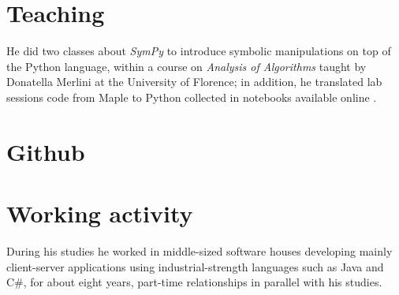\documentclass[a4paper]{tufte-handout}
\begin{document}
    \section{Teaching}

    He did two classes about \emph{SymPy} to introduce symbolic manipulations
    on top of the Python language, within a course on \emph{Analysis of
    Algorithms} taught by Donatella Merlini at the University of Florence; in
    addition, he translated lab sessions code from Maple to Python collected in
    notebooks available online
    .

    \section{Github}

    \section{Working activity}

    During his studies he worked in middle-sized software houses
     developing mainly client-server
    applications using industrial-strength languages such as Java and C\#, for
    about eight years, part-time relationships in parallel with his studies.
        
    
\end{document}
